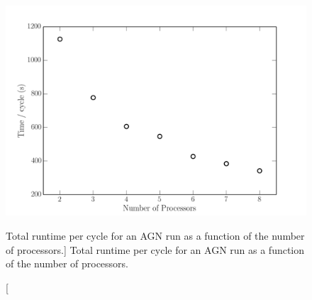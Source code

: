 \begin{figure}
\centering
\includegraphics[width=1.0\textwidth]{figures/03-radtrans/para_times.png}
\caption
[Total runtime per cycle for an AGN run as a 
function of the number of processors.]
{
Total runtime per cycle for an AGN run as a 
function of the number of processors.
} 
\label{fig:para_times}
\end{figure}











